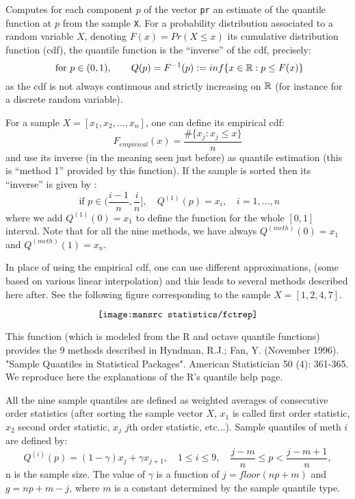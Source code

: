 \begin{mandescription}
 Computes for each component $p$ of the vector \verb+pr+ an estimate of the quantile function 
at $p$ from the sample \verb+X+. For a probability distribution associated to a random variable $X$, 
denoting $F(x) = Pr(X \le x)$ its cumulative distribution function (cdf), the quantile 
function is the ``inverse'' of the cdf, precisely:
$$
\mbox{ for } p \in (0,1), \qquad   Q(p) = F^{-1}(p) := inf \{ x \in \mathbb R : p \le F(x) \} 
$$
as the cdf is not always continuous and strictly increasing on $\mathbb R$ 
(for instance for a discrete random variable).

 For a sample $X=[x_1,x_2,\dots,x_n]$, one can define its empirical cdf:
$$
        F_{empirical}(x) = \frac{\#\{ x_j : x_j \le x \}}{n}
$$ 
and use its inverse (in the meaning seen just before) as quantile estimation (this is
``method 1'' provided by this function). If the sample is sorted then its ``inverse'' is given by :
$$
\mbox{ if } p \in (\frac{i-1}{n},\frac{i}{n}], \quad Q^{(1)}(p) = x_i, \quad i = 1, \dots, n 
$$ 
where we add  $Q^{(1)}(0) = x_1$ to define the function for the whole $[0,1]$ interval. Note that
for all the nine methods, we have always $Q^{(meth)}(0) = x_1$ and $Q^{(meth)}(1) = x_n$. 

In place of using the empirical cdf, one can use different approximations,
(some based on various linear interpolation) and this leads to several methods described here
after. See the following figure corresponding to the sample $X=[1,2,4,7]$.   

$$
\texttt{[image: \\mansrc statistics/fctrep]} 
$$




This function (which is modeled from the R and octave quantile functions) provides the 9 methods 
described in Hyndman, R.J.; Fan, Y. (November 1996). "Sample Quantiles in Statistical Packages". 
American Statistician 50 (4): 361-365. We reproduce here the explanations of the R's quantile
help page. 

All the nine sample quantiles are defined as weighted averages of consecutive order statistics
(after sorting the sample vector $X$, $x_1$ is called first order statistic, $x_2$ second order
statistic, $x_j$ $j$th  order statistic, etc...). Sample quantiles of meth $i$ are defined by:
$$
Q^{(i)}(p) = (1 - \gamma) x_j + \gamma x_{j+1}, \quad 1 \le i \le 9, \quad \frac{j-m}{n} \le p < \frac{j-m+1}{n},
$$
n is the sample size. The value of $\gamma$ is a function of $j = floor(np + m)$ and $g = np + m - j$, 
where $m$ is a constant determined by the sample quantile type. 


\end{mandescription}
